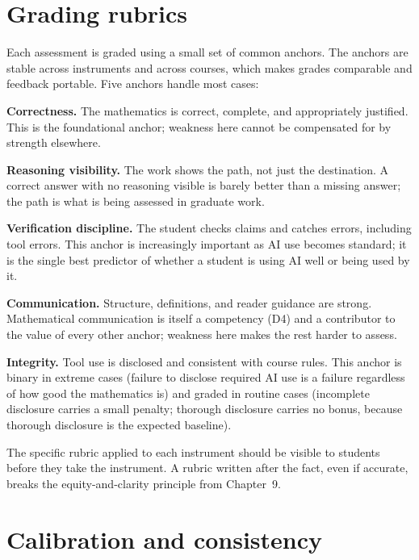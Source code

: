 \documentclass[11pt]{book}
\begin{document}
\section{Grading rubrics}

Each assessment is graded using a small set of common anchors. The anchors are stable across instruments and across courses, which makes grades comparable and feedback portable. Five anchors handle most cases:

\textbf{Correctness.} The mathematics is correct, complete, and appropriately justified. This is the foundational anchor; weakness here cannot be compensated for by strength elsewhere.

\textbf{Reasoning visibility.} The work shows the path, not just the destination. A correct answer with no reasoning visible is barely better than a missing answer; the path is what is being assessed in graduate work.

\textbf{Verification discipline.} The student checks claims and catches errors, including tool errors. This anchor is increasingly important as AI use becomes standard; it is the single best predictor of whether a student is using AI well or being used by it.

\textbf{Communication.} Structure, definitions, and reader guidance are strong. Mathematical communication is itself a competency (D4) and a contributor to the value of every other anchor; weakness here makes the rest harder to assess.

\textbf{Integrity.} Tool use is disclosed and consistent with course rules. This anchor is binary in extreme cases (failure to disclose required AI use is a failure regardless of how good the mathematics is) and graded in routine cases (incomplete disclosure carries a small penalty; thorough disclosure carries no bonus, because thorough disclosure is the expected baseline).

The specific rubric applied to each instrument should be visible to students before they take the instrument. A rubric written after the fact, even if accurate, breaks the equity-and-clarity principle from Chapter~9.

\section{Calibration and consistency}
\end{document}
